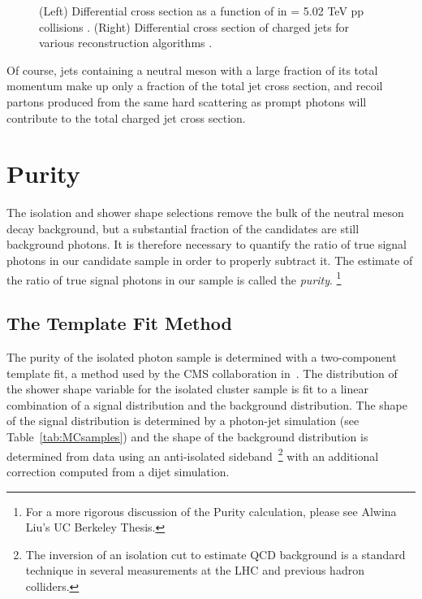 \begin{figure}[hbtp]
\caption{(Left) Differential cross section as a function of \ptgamma in \sqrts = 5.02 TeV pp collisions \cite{Acharya2019}. (Right) Differential cross section of charged jets for various reconstruction algorithms \cite{ALICECollaboration2015}.}
	\label{fig:cross_section_camparison}
\end{figure}
 
Of course, jets containing a neutral meson with a large fraction of its total momentum make up only a fraction of the total jet cross section, and recoil partons produced from the same hard scattering as prompt photons will contribute to the total charged jet cross section. 





\section{Purity}
\label{sec:purity}
The isolation and shower shape selections remove the bulk of the neutral meson decay background, but a substantial fraction of the \gammaiso candidates are still background photons. It is therefore necessary to quantify the ratio of true signal photons in our candidate sample in order to properly subtract it. The estimate of the ratio of true signal photons in our \gammaiso sample is called the \textit{purity}. \footnote{For a more rigorous discussion of the Purity calculation, please see Alwina Liu's UC Berkeley Thesis.}

\subsection{The Template Fit Method}
The purity of the isolated photon sample is determined with a two-component template fit, a method used by the CMS collaboration in~\cite{Sirunyan:2017qhf}. The distribution of the shower shape variable for the isolated cluster sample is fit to a linear combination of a signal distribution and the background distribution. The shape of the signal distribution is determined by a photon-jet simulation (see Table~\ref{tab:MCsamples}) and the shape of the background distribution is determined from data using an anti-isolated sideband~\footnote{The inversion of an isolation cut to estimate QCD background is a standard technique in several measurements at the LHC and previous hadron colliders.} with an additional correction computed from a dijet simulation. 

